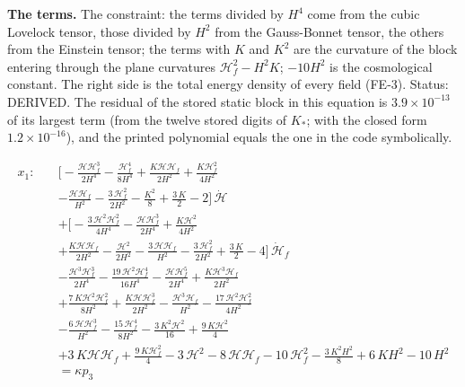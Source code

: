 \documentclass[
  10pt,
]{article}
\begin{document}
\textbf{The terms.} The constraint: the terms divided by \(H^4\) come
from the cubic Lovelock tensor, those divided by \(H^2\) from the
Gauss-Bonnet tensor, the others from the Einstein tensor; the terms with
\(K\) and \(K^2\) are the curvature of the block entering through the
plane curvatures \(\mathcal{H}_f^2 - H^2K\); \(-10H^2\) is the
cosmological constant. The right side is the total energy density of
every field (FE-3). Status: DERIVED. The residual of the stored static
block in this equation is \(3.9\times10^{-13}\) of its largest term
(from the twelve stored digits of \(K_*\); with the closed form
\(1.2\times10^{-16}\)), and the printed polynomial equals the one in the
code symbolically.

\[
\begin{aligned}
x_1:\quad &\Big[-\frac{\mathcal{H}\mathcal{H}_f^{3}}{2H^{4}} - \frac{\mathcal{H}_f^{4}}{8H^{4}} +
 \frac{K\mathcal{H}\mathcal{H}_f}{2H^{2}} + \frac{K\mathcal{H}_f^{2}}{4H^{2}} \\
 &- \frac{\mathcal{H}\mathcal{H}_f}{H^{2}} - \frac{3\,\mathcal{H}_f^{2}}{2H^{2}} - \frac{K^{2}}{8} +
 \frac{3\,K}{2} - 2\Big]\,\dot{\mathcal{H}} \\
 &+ \Big[-\frac{3\,\mathcal{H}^{2}\mathcal{H}_f^{2}}{4H^{4}} -
 \frac{\mathcal{H}\mathcal{H}_f^{3}}{2H^{4}} + \frac{K\mathcal{H}^{2}}{4H^{2}} \\
 &+ \frac{K\mathcal{H}\mathcal{H}_f}{2H^{2}} - \frac{\mathcal{H}^{2}}{2H^{2}} -
 \frac{3\,\mathcal{H}\mathcal{H}_f}{H^{2}} - \frac{3\,\mathcal{H}_f^{2}}{2H^{2}} + \frac{3\,K}{2} -
 4\Big]\,\dot{\mathcal{H}}_f \\
 &-\frac{\mathcal{H}^{3}\mathcal{H}_f^{3}}{2H^{4}} -
 \frac{19\,\mathcal{H}^{2}\mathcal{H}_f^{4}}{16H^{4}} - \frac{\mathcal{H}\mathcal{H}_f^{5}}{2H^{4}} +
 \frac{K\mathcal{H}^{3}\mathcal{H}_f}{2H^{2}} \\
 &+ \frac{7\,K\mathcal{H}^{2}\mathcal{H}_f^{2}}{8H^{2}} + \frac{K\mathcal{H}\mathcal{H}_f^{3}}{2H^{2}} -
 \frac{\mathcal{H}^{3}\mathcal{H}_f}{H^{2}} - \frac{17\,\mathcal{H}^{2}\mathcal{H}_f^{2}}{4H^{2}} \\
 &- \frac{6\,\mathcal{H}\mathcal{H}_f^{3}}{H^{2}} - \frac{15\,\mathcal{H}_f^{4}}{8H^{2}} -
 \frac{3\,K^{2}\mathcal{H}^{2}}{16} + \frac{9\,K\mathcal{H}^{2}}{4} \\
 &+ 3\,K\mathcal{H}\mathcal{H}_f + \frac{9\,K\mathcal{H}_f^{2}}{4} - 3\,\mathcal{H}^{2} -
 8\,\mathcal{H}\mathcal{H}_f - 10\,\mathcal{H}_f^{2} - \frac{3\,K^{2}H^{2}}{8} + 6\,KH^{2} - 10\,H^{2} \\
 &= \kappa p_3
\end{aligned} \tag{FE-39}
\]
\end{document}
